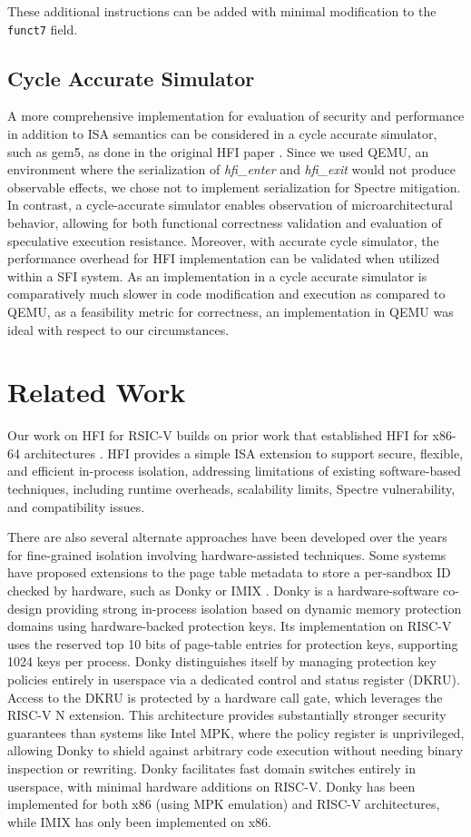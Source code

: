 \documentclass[conference,compsoc]{IEEEtran}
\begin{document}
These additional instructions can be added with minimal modification to the \texttt{funct7} field.

\subsection{Cycle Accurate Simulator}
A more comprehensive implementation for evaluation of security and performance in addition to ISA semantics can be considered in a cycle accurate simulator, such as gem5, as done in the original HFI paper \cite{HFI}.
Since we used QEMU, an environment where the serialization of \textit{hfi\_enter} and \textit{hfi\_exit} would not produce observable effects, we chose not to implement serialization for Spectre mitigation.
In contrast, a cycle-accurate simulator enables observation of microarchitectural behavior, allowing for both functional correctness validation and evaluation of speculative execution resistance.
Moreover, with accurate cycle simulator, the performance overhead for HFI implementation can be validated when utilized within a SFI system.
As an implementation in a cycle accurate simulator is comparatively much slower in code modification and execution as compared to QEMU, as a feasibility metric for correctness, an implementation in QEMU was ideal with respect to our circumstances.

\section{Related Work}
Our work on HFI for RSIC-V builds on prior work that established HFI for x86-64 architectures \cite{HFI}. HFI provides a simple ISA extension to support secure, flexible, and efficient in-process isolation, addressing limitations of existing software-based techniques, including runtime overheads, scalability limits, Spectre vulnerability, and compatibility issues.

There are also several alternate approaches have been developed over the years for fine-grained isolation involving hardware-assisted techniques. Some systems have proposed extensions to the page table metadata to store a per-sandbox ID checked by hardware, such as Donky \cite{Donky} or IMIX \cite{IMIX}. Donky is a hardware-software co-design providing strong in-process isolation based on dynamic memory protection domains using hardware-backed protection keys. Its implementation on RISC-V uses the reserved top 10 bits of page-table entries for protection keys, supporting 1024 keys per process. Donky distinguishes itself by managing protection key policies entirely in userspace via a dedicated control and status register (DKRU). Access to the DKRU is protected by a hardware call gate, which leverages the RISC-V N extension. This architecture provides substantially stronger security guarantees than systems like Intel MPK, where the policy register is unprivileged, allowing Donky to shield against arbitrary code execution without needing binary inspection or rewriting. Donky facilitates fast domain switches entirely in userspace, with minimal hardware additions on RISC-V. Donky has been implemented for both x86 (using MPK emulation) and RISC-V architectures, while IMIX has only been implemented on x86.
\end{document}
